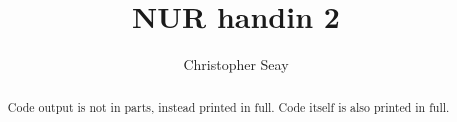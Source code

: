\documentclass[a4paper,10pt]{article}
\title{NUR handin 2}
\author{Christopher Seay}
\begin{document}
\maketitle

\begin{abstract}
 Code output is not in parts, instead printed in full. Code itself is also
 printed in full.
\end{abstract}














































\end{document}
